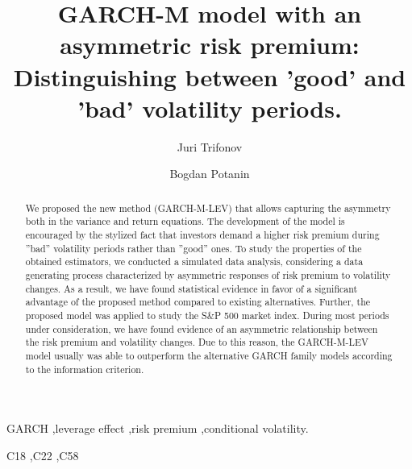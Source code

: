 \documentclass[authoryear, 1p]{elsarticle}
\numberwithin{equation}{section}
\begin{document}
\begin{frontmatter}
 
\title{GARCH-M model with an asymmetric risk premium: Distinguishing between 'good' and 'bad' volatility periods.} 

 \author[1]{Juri Trifonov}
\author[2]{Bogdan Potanin} 




\begin{abstract}
We proposed the new method (GARCH-M-LEV) that allows capturing the asymmetry both in the variance and return equations. The development of the model is encouraged by the stylized fact that investors demand a higher risk premium during ''bad'' volatility periods rather than ''good'' ones. To study the properties of the obtained estimators, we conducted a simulated data analysis, considering a data generating process characterized by asymmetric responses of risk premium to volatility changes.
As a result, we have found statistical evidence in favor of a significant advantage of the proposed method compared to existing alternatives. Further, the proposed model was applied to study the S\&P 500 market index. During most periods under consideration, we have found evidence of an asymmetric relationship between the risk premium and volatility changes. Due to this reason, the GARCH-M-LEV model usually was able to outperform the alternative GARCH family models according to the information criterion.
\end{abstract}

\begin{keyword}
GARCH \sep leverage effect \sep risk premium \sep conditional volatility.


\JEL C18 \sep C22 \sep C58
\end{keyword}

\end{frontmatter}
\end{document}
